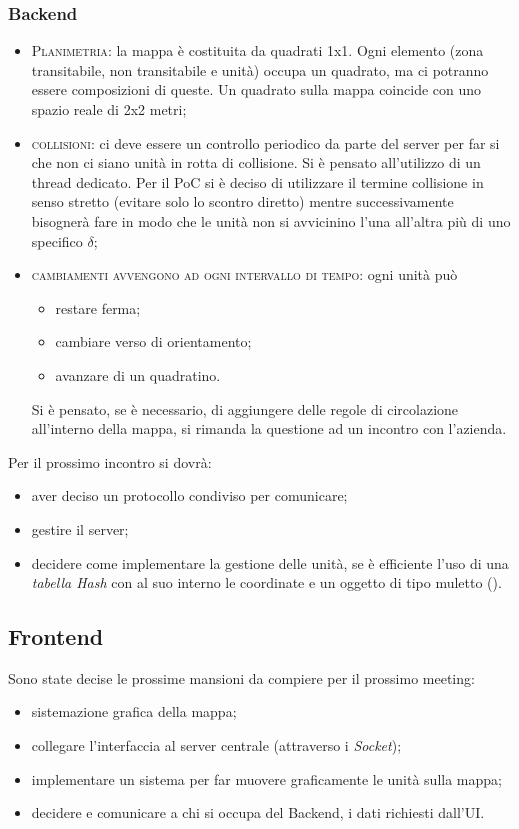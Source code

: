 \subsubsection{Backend}
\begin{itemize}
	\item \textsc{Planimetria}: la mappa è costituita da quadrati 1x1. Ogni elemento (zona transitabile, non transitabile e unità) occupa un quadrato, ma ci potranno essere composizioni di queste. Un quadrato sulla mappa coincide con uno spazio reale di 2x2 metri;
	\item \textsc{collisioni:} ci deve essere un controllo periodico da parte del server per far si che non ci siano unità in rotta di collisione. Si è pensato all'utilizzo di un thread dedicato. Per il PoC si è deciso di utilizzare il termine collisione in senso stretto (evitare solo lo scontro diretto) mentre successivamente bisognerà fare in modo che le unità non si avvicinino l'una all'altra più di uno specifico $\delta$;
	\item \textsc{cambiamenti avvengono ad ogni intervallo di tempo:} ogni unità può 
	\begin{itemize}
		\item restare ferma;
		\item cambiare verso di orientamento;
		\item avanzare di un quadratino.
	\end{itemize} 
	Si è pensato, se è necessario, di aggiungere delle regole di circolazione all'interno della mappa, si rimanda la questione ad un incontro con l'azienda.
	
		
\end{itemize}
Per il prossimo incontro si dovrà:
\begin{itemize}
	\item aver deciso un protocollo condiviso per comunicare;
	\item gestire il server;
	\item decidere come implementare la gestione delle unità, se è efficiente l'uso di una \textit{tabella Hash} con al suo interno le coordinate e un oggetto di tipo muletto ().
\end{itemize}

\subsection{Frontend}
Sono state decise le prossime mansioni da compiere per il prossimo meeting:
\begin{itemize}
	\item sistemazione grafica della mappa;
	\item collegare l'interfaccia al server centrale (attraverso i \textit{Socket});
	\item implementare un sistema per far muovere graficamente le unità sulla mappa;
	\item decidere e comunicare a chi si occupa del Backend, i dati richiesti dall'UI.
\end{itemize}